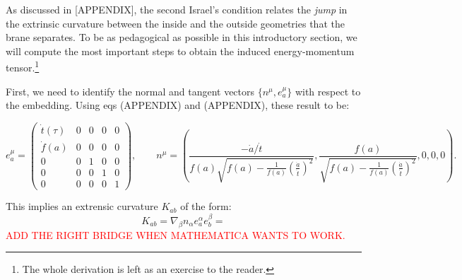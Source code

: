 As discussed in [APPENDIX], the second Israel's condition relates the \textit{jump} in the extrinsic curvature between the inside and the outside geometries that the brane separates. To be as pedagogical as possible in this introductory section, we will compute the most important steps to obtain the induced energy-momentum tensor.\footnote{The whole derivation is left as an exercise to the reader.}

First, we need to identify the normal and tangent vectors $\{n^{\mu}, e^{\mu}_{a}\}$ with respect to the embedding. Using eqs (APPENDIX) and (APPENDIX),  these result to be:
\begin{small}
\begin{equation}
	e^{\mu}_{a} = \begin{pmatrix} \dot{t}(\tau) &0&0&0&0\\\dot{f}(a)&0&0&0&0\\0&0&1&0&0\\0&0&0&1&0\\0&0&0&0&1 \end{pmatrix}, \qquad n^{\mu} = \left(\frac{-\dot{a}/\dot{t}}{f(a)\sqrt{f(a) - \tfrac{1}{f(a)} \left(\tfrac{\dot{a}}{\dot{t}}\right)^{2}}}, \frac{f(a)}{\sqrt{f(a) - \tfrac{1}{f(a)} \left(\tfrac{\dot{a}}{\dot{t}}\right)^{2}}}, 0,0,0 \right).
\end{equation}
\end{small}
This implies an extrensic curvature $K_{ab}$ of the form:
\begin{equation}
	K_{ab} = \nabla_{\beta} n_{\alpha} e^{\alpha}_{a} e^{\beta}_{b} = 
\end{equation}
\textcolor{red}{ADD THE RIGHT BRIDGE WHEN MATHEMATICA WANTS TO WORK.}

